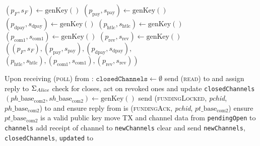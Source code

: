 \begin{algorithmic}[1]
     
      \State $\left(p_F, s_F\right) \gets \mathrm{genKey}\left(\right)$
      \State $\left(p_{\mathrm{pay}}, s_{\mathrm{pay}}\right) \gets
      \mathrm{genKey}\left(\right)$ 
      \State $\left(p_{\mathrm{dpay}}, s_{\mathrm{dpay}}\right) \gets
      \mathrm{genKey}\left(\right)$ 
      \State $\left(p_{\mathrm{htlc}}, s_{\mathrm{htlc}}\right) \gets
      \mathrm{genKey}\left(\right)$ 
      \State $\left(p_{\mathrm{com}1}, s_{\mathrm{com}1}\right) \gets
      \mathrm{genKey}\left(\right)$ 
      \State $\left(p_{\mathrm{rev}}, s_{\mathrm{rev}}\right) \gets
      \mathrm{genKey}\left(\right)$ 
      \State \Return $\left(\left(p_F, s_F\right), \left(p_{\mathrm{pay}},
      s_{\mathrm{pay}}\right), \left(p_{\mathrm{dpay}},
      s_{\mathrm{dpay}}\right),\right.$
      \Indent
        \State $\left.\left(p_{\mathrm{htlc}}, s_{\mathrm{htlc}}\right),
        \left(p_{\mathrm{com}1}, s_{\mathrm{com}1}\right),
        \left(p_{\mathrm{rev}}, s_{\mathrm{rev}}\right)\right)$
      \EndIndent
    \EndFunction
    \State

    \State Upon receiving (\textsc{poll}) from \environment:
    \Indent
      \State $\mathtt{closedChannels} \gets \emptyset$
      \State send (\textsc{read}) to \ledger{} and assign reply to
      $\Sigma_{\mathit{Alice}}$
      \State check for closes, act on revoked ones and update
      \texttt{closedChannels} 
        \State $\left(ph\_\mathrm{base}_{\mathrm{com}2},
        sh\_\mathrm{base}_{\mathrm{com}2}\right) \gets
        \mathrm{genKey}\left(\right)$
        \State send (\textsc{fundingLocked}, \textit{pchid},
        $ph\_\mathrm{base}_{\mathrm{com}2}$) to \bob{}  and
        ensure reply from \bob{} is (\textsc{fundingAck}, \textit{pchid},
        $pt\_\mathrm{base}_{\mathrm{com}2}$)
        \State ensure $pt\_\mathrm{base}_{\mathrm{com}2}$ is a valid public key
        \State move TX and channel data from \texttt{pendingOpen} to
        \texttt{channels}
        \State add receipt of channel to \texttt{newChannels}
      \EndFor
      \State clear and send \texttt{newChannels}, \texttt{closedChannels},
      \texttt{updated} to \environment
    \EndIndent
    \State


\end{algorithmic}
